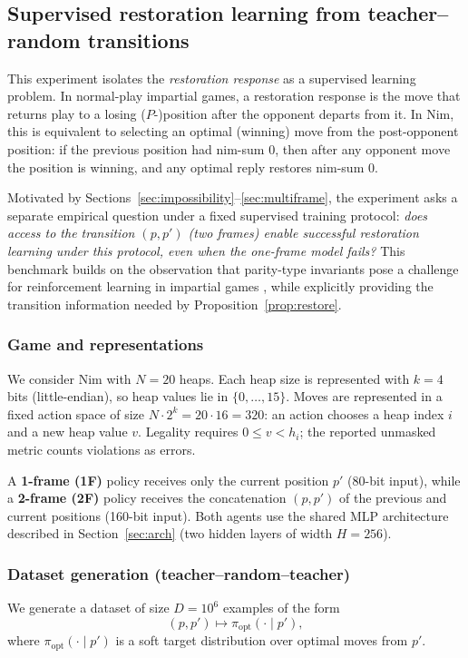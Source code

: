 \documentclass[twoside,11pt]{article}
\numberwithin{theorem}{section}
\numberwithin{equation}{section}
\begin{document}
\subsection{Supervised restoration learning from teacher--random transitions}
\label{sec:supervised-restoration}
\label{sec:exp-restoration}

This experiment isolates the \emph{restoration response} as a supervised learning problem.
In normal-play impartial games, a restoration response is the move that returns play to a losing ($P$-)position after the opponent departs from it.
In Nim, this is equivalent to selecting an optimal (winning) move from the post-opponent position: if the previous position had nim-sum $0$, then after any opponent move the position is winning, and any optimal reply restores nim-sum $0$.

Motivated by Sections~\ref{sec:impossibility}--\ref{sec:multiframe}, the experiment asks a separate empirical question under a fixed supervised training protocol:
\emph{does access to the transition $(p,p')$ (two frames) enable successful restoration learning under this protocol, even when the one-frame model fails?}
This benchmark builds on the observation that parity-type invariants pose a challenge for reinforcement learning in impartial games \citep{zhou2022impartial,zhou2023parity}, while explicitly providing the transition information needed by Proposition~\ref{prop:restore}.

\subsubsection{Game and representations}
We consider Nim with $N=20$ heaps.
Each heap size is represented with $k=4$ bits (little-endian), so heap values lie in $\{0,\ldots,15\}$.
Moves are represented in a fixed action space of size $N\cdot 2^k = 20\cdot 16 = 320$:
an action chooses a heap index $i$ and a new heap value $v$. Legality requires $0\le v<h_i$; the reported unmasked metric counts violations as errors.

A \textbf{1-frame (1F)} policy receives only the current position $p'$ (80-bit input),
while a \textbf{2-frame (2F)} policy receives the concatenation $(p,p')$ of the previous and current positions (160-bit input).
Both agents use the shared MLP architecture described in Section~\ref{sec:arch} (two hidden layers of width $H=256$).

\subsubsection{Dataset generation (teacher--random--teacher)}
We generate a dataset of size $D=10^6$ examples of the form
\[
(p, p') \mapsto \pi_{\mathrm{opt}}(\cdot \mid p') ,
\]
where $\pi_{\mathrm{opt}}(\cdot \mid p')$ is a soft target distribution over optimal moves from $p'$.
\end{document}
